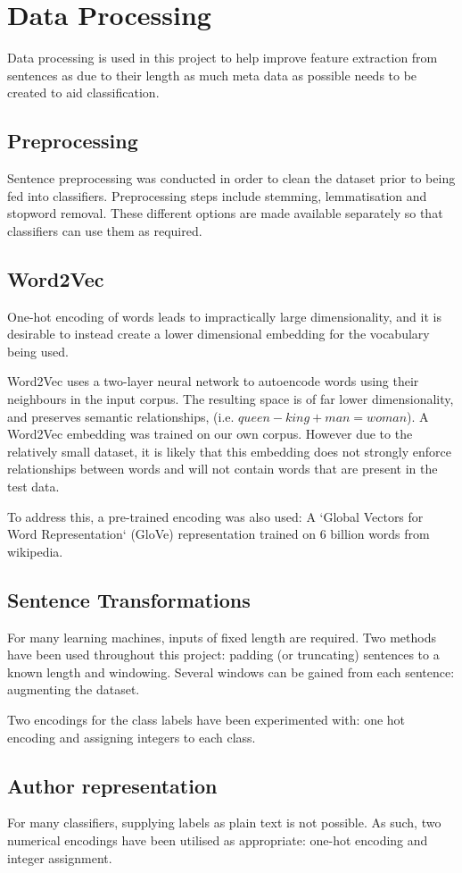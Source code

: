 \section{Data Processing}
\label{sec:data_processing}

Data processing is used in this project to help improve feature extraction from sentences as due to their length as much meta data as possible needs to be created to aid classification.

  \subsection{Preprocessing}
  \label{sec:preprocessing}
  	Sentence preprocessing was conducted in order to clean the dataset prior to being fed into classifiers.
  	Preprocessing steps include stemming, lemmatisation and stopword removal. These different options are made available separately so that classifiers can use them as required.

  \subsection{Word2Vec}
  \label{sec:word2vec}
  One-hot encoding of words leads to impractically large dimensionality, and it is desirable to instead create a lower dimensional embedding for the vocabulary being used.
  
  Word2Vec uses a two-layer neural network to autoencode words using their neighbours in the input corpus. The resulting space is of far lower dimensionality, and preserves semantic relationships, (i.e. $queen - king + man = woman$). A Word2Vec embedding was trained on our own corpus. However due to the relatively small dataset, it is likely that this embedding does not strongly enforce relationships between words and will not contain words that are present in the test data.
  
To address this, a pre-trained encoding was also used: A `Global Vectors for Word Representation` (GloVe) representation trained on 6 billion words from wikipedia.

  \subsection{Sentence Transformations}
  \label{sec:sentence_transformations}

    For many learning machines, inputs of fixed length
    are required. Two methods have been used throughout this project: padding
    (or truncating) sentences to a known length and
    windowing. Several windows can be gained from each
    sentence: augmenting the dataset.

    Two encodings for the class labels have been experimented with: one hot
    encoding and assigning integers to each class.

\subsection{Author representation}
\label{sec:author_representation}
For many classifiers, supplying labels as plain text is not possible. As such, two numerical encodings have been utilised as appropriate: one-hot encoding and integer assignment.